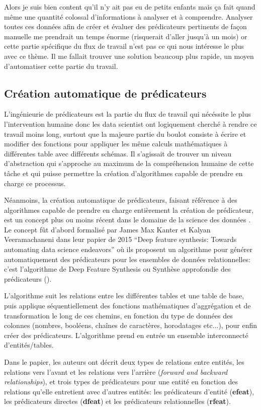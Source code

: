 Alors je suis bien content qu'il n'y ait pas eu de petits enfants mais ça fait quand même une quantité colossal d'informations à analyser et à comprendre. Analyser toutes ces données afin de créer et évaluer des prédicateurs pertinents de façon manuelle me prendrait un temps énorme (risquerait d'aller jusqu'à un mois) or cette partie spécifique du flux de travail n'est pas ce qui nous intéresse le plus avec ce thème. Il me fallait trouver une solution beaucoup plus rapide, un moyen d'automatiser cette partie du travail.

\subsection{Création automatique de prédicateurs}
\label{chap3.sec1.sub1}
L'ingénieurie de prédicateurs est la partie du flux de travail qui nécéssite le plus l'intervention humaine donc les data scientist ont logiquement cherché à rendre ce travail moins long, surtout que la majeure partie du boulot consiste à écrire et modifier des fonctions pour appliquer les même calculs mathématiques à différentes table avec différents schémas. Il s'agissait de trouver un niveau d'abstraction qui s'approche au maximum de la compréhension humaine de cette tâche et qui puisse permettre la création d'algorithmes capable de prendre en charge ce processus.

Néanmoins, la création automatique de prédicateurs, faisant référence à des algorithmes capable de prendre en charge entièrement la création de prédicateur, est un concept plus ou moins récent dans le domaine de la science des données . Le concept fût d’abord formalisé par James Max Kanter et Kalyan Veeramachaneni dans leur papier de 2015 “Deep feature synthesis: Towards automating data science endeavors” où ils proposent un algorithme pour générer automatiquement des prédicateurs pour les ensembles de données relationnelles: c’est l’algorithme de Deep Feature Synthesis ou Synthèse approfondie des prédicateurs (\cite{kanter2015deep}).

L'algorithme suit les relations entre les différentes tables et une table de base, puis
applique séquentiellement des fonctions mathématiques d'aggrégation et de transformation le long de ces chemins, en fonction du type de données des colonnes (nombres, booléens, chaînes de caractères, horodatages etc...), pour enfin créer des prédicateurs. L’algorithme prend en entrée un ensemble interconnecté d’entités/tables.

Dans le papier, les auteurs ont décrit deux types de relations entre entités, les relations vers l'avant et les relations vers l'arrière (\textit{forward and backward relationships}), et trois types de prédicateurs pour une entité en fonction des relations qu'elle entretient avec d'autres entités: les prédicateurs d’entité (\textbf{efeat}), les prédicateurs directes (\textbf{dfeat}) et les prédicateurs relationnelles (\textbf{rfeat}).

